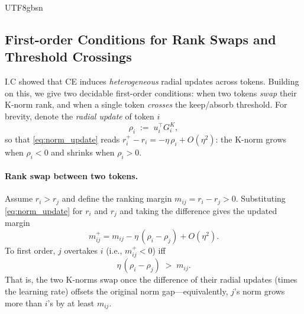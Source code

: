 \documentclass[10pt,twocolumn,letterpaper]{article}
\begin{document}
\begin{CJK}{UTF8}{gbsn}
\subsection{First-order Conditions for Rank Swaps and Threshold Crossings}

I.C showed that CE induces \emph{heterogeneous} radial updates across tokens.
Building on this, we give two decidable first-order conditions: when two tokens
\emph{swap} their K-norm rank, and when a single token \emph{crosses} the
keep/absorb threshold. For brevity, denote the \emph{radial update} of token $i$
\begin{equation}
    \rho_i \;:=\; u_i^\top G_i^K,
\end{equation}
so that \eqref{eq:norm_update} reads $r_i^+-r_i=-\eta\,\rho_i+O(\eta^2)$: the
K-norm grows when $\rho_i<0$ and shrinks when $\rho_i>0$.

\paragraph{Rank swap between two tokens.}
Assume $r_i>r_j$ and define the ranking margin $m_{ij}=r_i-r_j>0$. Substituting
\eqref{eq:norm_update} for $r_i$ and $r_j$ and taking the difference gives the
updated margin
\begin{equation}
    m_{ij}^+=m_{ij}-\eta\,(\rho_i-\rho_j)+O(\eta^2).
    \label{eq:rank_margin}
\end{equation}
To first order, $j$ overtakes $i$ (i.e., $m_{ij}^+<0$) iff
\begin{equation}
    \eta\,(\rho_i-\rho_j)\;>\;m_{ij}.
    \label{eq:rank_crossing}
\end{equation}
That is, the two K-norms swap once the difference of their radial updates (times
the learning rate) offsets the original norm gap—equivalently, $j$'s norm grows
more than $i$'s by at least $m_{ij}$.


\end{CJK}
\end{document}
